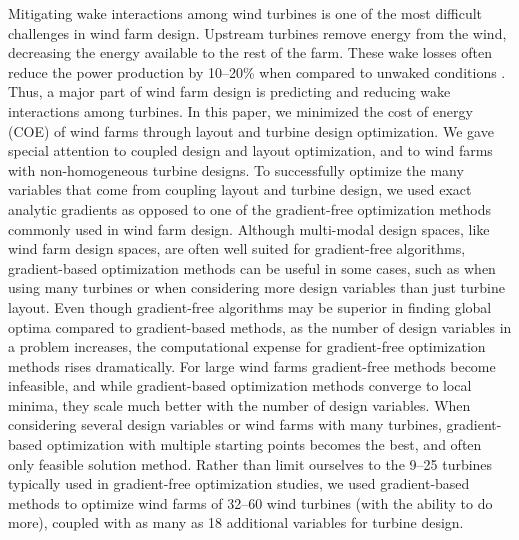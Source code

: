 \documentclass[WESD, manuscript]{copernicus}
\begin{document}
\introduction 
Mitigating wake interactions among wind turbines is one of the most difficult challenges in wind farm design. Upstream turbines remove energy from the wind, decreasing the energy available to the rest of the farm. These wake losses often reduce the power production by 10--20\% when compared to unwaked conditions \citep{barthelmie2007modelling,barthelmie2009modelling,briggs2013navigating}. 
Thus, a major part of wind farm design is predicting and reducing wake interactions among turbines. 
In this paper, we minimized the cost of energy (COE) of wind farms through layout and turbine design optimization. We gave special attention to coupled design and layout optimization, and to wind farms with non-homogeneous turbine designs.
To successfully optimize the many variables that come from coupling layout and turbine design, we used exact analytic gradients as opposed to one of the gradient-free optimization methods commonly used in wind farm design.
Although multi-modal design spaces, like wind farm design spaces, are often well suited for gradient-free algorithms, gradient-based optimization methods can be useful in some cases, such as when using many turbines or when considering more design variables than just turbine layout. Even though gradient-free algorithms may be superior in finding global optima compared to gradient-based methods, as the number of design variables in a problem increases, the computational expense for gradient-free optimization methods rises dramatically. 
For large wind farms gradient-free methods become infeasible, and while gradient-based optimization methods converge to local minima, they scale much better with the number of design variables.
When considering several design variables or wind farms with many turbines,
gradient-based optimization with multiple starting points becomes the best, and often only feasible solution method. Rather than limit ourselves to the 9--25 turbines typically used in gradient-free optimization studies, we used gradient-based methods to optimize wind farms of 32--60 wind turbines (with the ability to do more), coupled with as many as 18 additional variables for turbine design.
\end{document}
